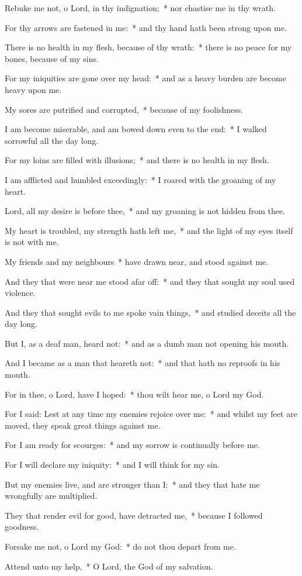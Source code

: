 \begin{enpars}
\item Rebuke me not, o Lord, in thy indignation;~* nor chastise me in thy wrath.
\item For thy arrows are fastened in me:~* and thy hand hath been strong upon me.
\item There is no health in my flesh, because of thy wrath:~* there is no peace for my bones, because of my sins.
\item For my iniquities are gone over my head:~* and as a heavy burden are become heavy upon me.
\item My sores are putrified and corrupted,~* because of my foolishness.
\item I am become miserable, and am bowed down even to the end:~* I walked sorrowful all the day long.
\item For my loins are filled with illusions;~* and there is no health in my flesh.
\item I am afflicted and humbled exceedingly:~* I roared with the groaning of my heart.
\item Lord, all my desire is before thee,~* and my groaning is not hidden from thee.
\item My heart is troubled, my strength hath left me,~* and the light of my eyes itself is not with me.
\item My friends and my neighbours~* have drawn near, and stood against me.
\item And they that were near me stood afar off:~* and they that sought my soul used violence.
\item And they that sought evils to me spoke vain things,~* and studied deceits all the day long.
\item But I, as a deaf man, heard not:~* and as a dumb man not opening his mouth.
\item And I became as a man that heareth not:~* and that hath no reproofs in his mouth.
\item For in thee, o Lord, have I hoped:~* thou wilt hear me, o Lord my God.
\item For I said: Lest at any time my enemies rejoice over me:~* and whilst my feet are moved, they speak great things against me.
\item For I am ready for scourges:~* and my sorrow is continually before me.
\item For I will declare my iniquity:~* and I will think for my sin.
\item But my enemies live, and are stronger than I:~* and they that hate me wrongfully are multiplied.
\item They that render evil for good, have detracted me,~* because I followed goodness.
\item Forsake me not, o Lord my God:~* do not thou depart from me.
\item Attend unto my help,~* O Lord, the God of my salvation.
\end{enpars}